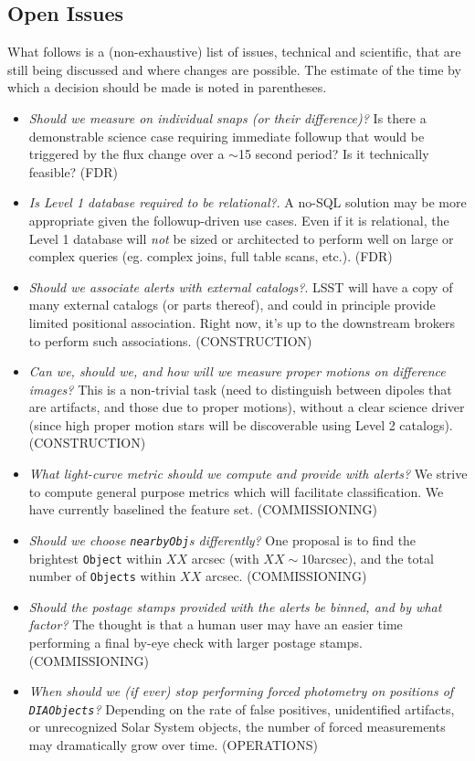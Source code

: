 \documentclass[12pt]{article}
\newcommand{\code}[1]{\texttt{#1}}
\newcommand{\DIAObjects}{\code{DIAObjects}\xspace}
\newcommand{\DB}{{Level 1 database}\xspace}
\newcommand{\Object}{\code{Object}\xspace}
\newcommand{\Objects}{\code{Objects}\xspace}
\begin{document}
\begin{openissues}
\subsection{Open Issues}

What follows is a (non-exhaustive) list of issues, technical and scientific, that are still being discussed and where changes are possible. The estimate of the time by which a decision should be made is noted in parentheses.

\begin{itemize}
    \item {\em Should we measure on individual snaps (or their difference)?} Is there a demonstrable science case requiring immediate followup that would be triggered by the flux change over a $\sim$15 second period? Is it technically feasible? (FDR)
    \item {\em Is \DB required to be relational?}. A no-SQL solution may be more appropriate given the followup-driven use cases. Even if it is relational, the Level 1 database will {\em not} be sized or architected to perform well on large or complex queries (eg. complex joins, full table scans, etc.). (FDR)
    \item {\em Should we associate alerts with external catalogs?}. LSST will have a copy of many external catalogs (or parts thereof), and could in principle provide limited positional association. Right now, it's up to the downstream brokers to perform such associations. (CONSTRUCTION)
    \item {\em Can we, should we, and how will we measure proper motions on difference images?} This is a non-trivial task (need to distinguish between dipoles that are artifacts, and those due to proper motions), without a clear science driver (since high proper motion stars will be discoverable using Level 2 catalogs). (CONSTRUCTION)
    \item {\em What light-curve metric should we compute and provide with alerts?} We strive to compute general purpose metrics which will facilitate classification. We have currently baselined the \citet{2011ApJ...733...10R} feature set. (COMMISSIONING)
    \item {\em Should we choose {\tt nearbyObj}s differently?} One proposal is to find the brightest \Object within $XX$ arcsec (with $XX \sim 10$arcsec), and the total number of \Objects within $XX$ arcsec. (COMMISSIONING)
    \item {\em Should the postage stamps provided with the alerts be binned, and by what factor?} The thought is that a human user may have an easier time performing a final by-eye check with larger postage stamps. (COMMISSIONING)
    \item {\em When should we (if ever) stop performing forced photometry on positions of \DIAObjects?} Depending on the rate of false positives, unidentified artifacts, or unrecognized Solar System objects, the number of forced measurements may dramatically grow over time. (OPERATIONS)

\end{itemize}
\end{openissues}
\end{document}
